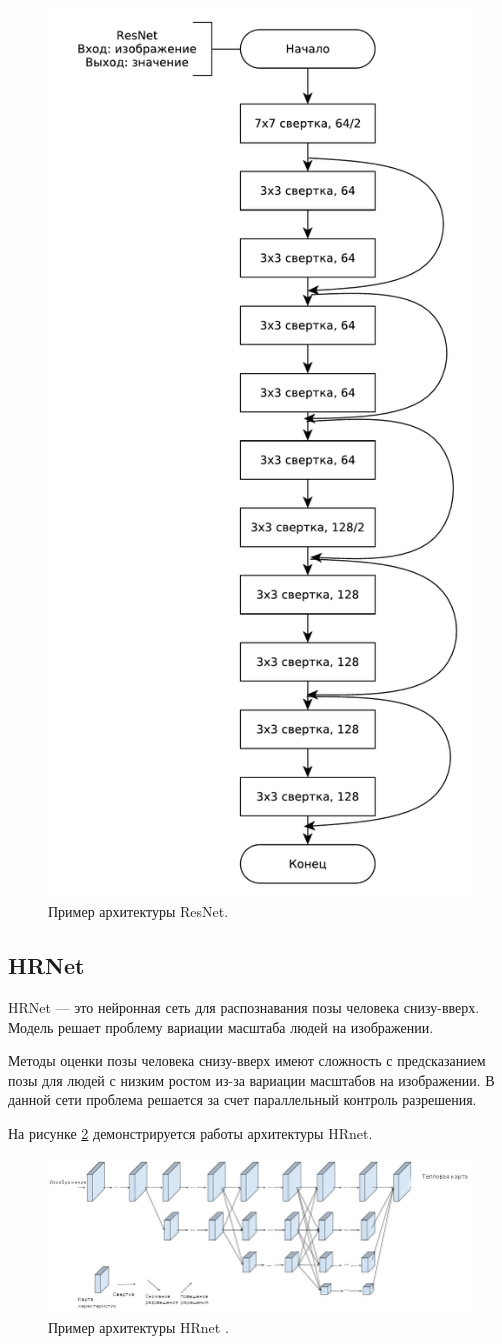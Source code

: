 \begin{figure}[ht!]
	\centering
	\includegraphics[width=0.5\linewidth]{assets/resnet.pdf}
	\caption{Пример архитектуры ResNet.}
	\label{fig:resnet-2}
\end{figure}

\subsection{HRNet}

HRNet \cite{Hrenet} --- это нейронная сеть для распознавания позы человека снизу-вверх. Модель решает проблему вариации масштаба людей на изображении.

Методы оценки позы человека снизу-вверх имеют сложность с предсказанием позы для людей с низким ростом из-за вариации масштабов на изображении. В данной сети проблема решается за счет параллельный контроль разрешения.

На рисунке \ref{fig:hrenet} демонстрируется работы архитектуры HRnet.

\begin{figure}[ht!]
	\centering
	\includegraphics[width=0.9\linewidth]{assets/hrenet.jpeg}
	\caption{Пример архитектуры HRnet \cite{Hrenet}.}
	\label{fig:hrenet}
\end{figure} 

